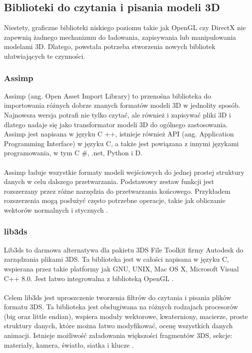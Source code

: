 \subsection{Biblioteki do czytania i pisania modeli 3D}
Niestety, graficzne biblioteki niskiego poziomu takie jak OpenGL czy DirectX nie zapewnią żadnego mechanizmu do ładowania, zapisywania lub manipulowania modelami 3D. Dlatego, powstała potrzeba stworzenia nowych bibliotek ułatwiających te czynności. 

\subsubsection{Assimp}
Assimp (ang. Open Asset Import Library) to przenośna biblioteka do importowania różnych dobrze znanych formatów modeli 3D w jednolity sposób. Najnowsza wersja potrafi nie tylko czytać, ale również i zapisywać pliki 3D i dlatego nadaje się jako transformator modeli 3D do ogólnego zastosowania. Assimp jest napisana w języku C ++, istnieje również API (ang. Application Programming Interface) w języku C, a także jest powiązana z innymi językami programowania, w tym C \#, .net, Python i D. \paragraph{}
Assimp ładuje wszystkie formaty modeli wejściowych do jednej prostej struktury danych w celu dalszego przetwarzania. Podstawowy zestaw funkcji jest rozszerzany przez różne narzędzia do przetwarzania końcowego. Przykładem rozszerzenia mogą posłużyć często potrzebne operacje, takie jak obliczanie wektorów normalnych i stycznych \cite{assimp}.
\subsubsection{lib3ds}
Lib3ds to darmowa alternatywa dla pakietu 3DS File Toolkit firmy Autodesk do zarządzania plikami 3DS. Ta biblioteka jest w całości napisana w języku C, wspierana przez takie platformy jak GNU, UNIX, Mac OS X, Microsoft Visual C++ 8.0. Jest łatwo integrowalna z biblioteką OpenGL \cite{lib3dsofficial}. \paragraph{}
Celem lib3ds jest uproszczenie tworzenia filtrów do czytania i pisania plików formatu 3DS. Ta biblioteka jest obsługiwana na różnych rodzajach procesorów (big oraz little endian), wspiera moduły wektorowe, kwaterniony, macierze, proste struktury danych, które można łatwo modyfikować, ocenę wszystkich danych animacji. Istnieje możliwość załadowania większości fragmentów 3DS, sekcje: materiały, kamera, światło, siatka i klucze \cite{lib3dsdirectory}.
\newpage
